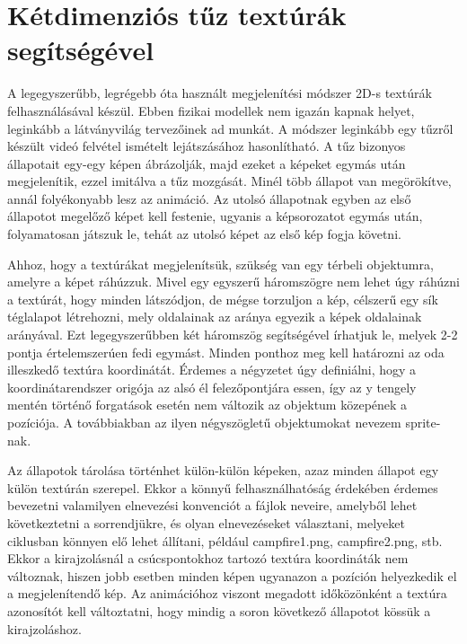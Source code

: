 

\section{Kétdimenziós tűz textúrák segítségével}
A legegyszerűbb, legrégebb óta használt megjelenítési módszer 2D-s textúrák felhasználásával készül. Ebben fizikai modellek nem igazán kapnak helyet, leginkább a látványvilág tervezőinek ad munkát. A módszer leginkább egy tűzről készült videó felvétel ismételt lejátszásához hasonlítható. A tűz bizonyos állapotait egy-egy képen ábrázolják, majd ezeket a képeket egymás után megjelenítik, ezzel imitálva a tűz mozgását. Minél több állapot van megörökítve, annál folyékonyabb lesz az animáció. Az utolsó állapotnak egyben az első állapotot megelőző képet kell festenie, ugyanis a képsorozatot egymás után, folyamatosan játszuk le, tehát az utolsó képet az első kép fogja követni.

Ahhoz, hogy a textúrákat megjelenítsük, szükség van egy térbeli objektumra, amelyre a képet ráhúzzuk. Mivel egy egyszerű háromszögre nem lehet úgy ráhúzni a textúrát, hogy minden látszódjon, de mégse torzuljon a kép, célszerű egy sík téglalapot létrehozni, mely oldalainak az aránya egyezik a képek oldalainak arányával. Ezt legegyszerűbben két háromszög segítségével írhatjuk le, melyek 2-2 pontja értelemszerúen fedi egymást. Minden ponthoz meg kell határozni az oda illeszkedő textúra koordinátát. Érdemes a négyzetet úgy definiálni, hogy a koordinátarendszer origója az alsó él felezőpontjára essen, így az y tengely mentén történő forgatások esetén nem változik az objektum közepének a pozíciója. A továbbiakban az ilyen négyszögletű objektumokat nevezem sprite-nak.

Az állapotok tárolása történhet külön-külön képeken, azaz minden állapot egy külön textúrán szerepel. Ekkor a könnyű felhasználhatóság érdekében érdemes bevezetni valamilyen elnevezési konvenciót a fájlok neveire, amelyből lehet következtetni a sorrendjükre, és olyan elnevezéseket választani, melyeket ciklusban könnyen elő lehet állítani, például campfire1.png, campfire2.png, stb. Ekkor a kirajzolásnál a csúcspontokhoz tartozó textúra koordináták nem változnak, hiszen jobb esetben minden képen ugyanazon a pozíción helyezkedik el a megjelenítendő kép. Az animációhoz viszont megadott időközönként a textúra azonosítót kell változtatni, hogy mindig a soron következő állapotot kössük a kirajzoláshoz.

